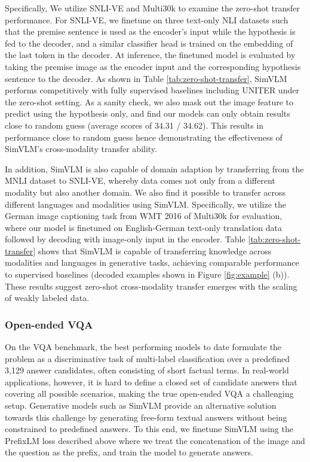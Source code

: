 Specifically, We utilize SNLI-VE and Multi30k to examine the zero-shot transfer performance. For SNLI-VE, we finetune on three text-only NLI datasets such that the premise sentence is used as the encoder's input while the hypothesis is fed to the decoder, and a similar classifier head is trained on the embedding of the last token in the decoder. At inference, the finetuned model is evaluated by taking the premise image as the encoder input and the corresponding hypothesis sentence to the decoder. As shown in Table \ref{tab:zero-shot-transfer}, {SimVLM} performs competitively with fully supervised baselines including UNITER under the zero-shot setting. As a sanity check, we also mask out the image feature to predict using the hypothesis only, and find our models can only obtain results close to random guess (average scores of 34.31 / 34.62). This results in performance close to random guess hence demonstrating the effectiveness of {SimVLM}'s cross-modality transfer ability.

In addition, {SimVLM} is also capable of domain adaption by transferring from the MNLI dataset to SNLI-VE, whereby data comes not only from a different modality but also another domain. We also find it possible to transfer across different languages and modalities using {SimVLM}. Specifically, we utilize the German image captioning task from WMT 2016 of Multi30k for evaluation, where our model is finetuned on English-German text-only translation data followed by decoding with image-only input in the encoder. Table \ref{tab:zero-shot-transfer} shows that {SimVLM} is capable of transferring knowledge across modalities and languages in generative tasks, achieving comparable performance to supervised baselines (decoded examples shown in Figure \ref{fig:example} (b)). These results suggest zero-shot cross-modality transfer emerges with the scaling of weakly labeled data.

\subsubsection{Open-ended VQA}

On the VQA benchmark, the best performing models to date formulate the problem as a discriminative task of multi-label classification over a predefined 3,129 answer candidates, often consisting of short factual terms. In real-world applications, however, it is hard to define a closed set of candidate answers that covering all possible scenarios, making the true open-ended VQA a challenging setup. Generative models such as {SimVLM} provide an alternative solution towards this challenge by generating free-form textual answers without being constrained to predefined answers. To this end, we finetune {SimVLM} using the PrefixLM loss described above where we treat the concatenation of the image and the question as the prefix, and train the model to generate answers.

